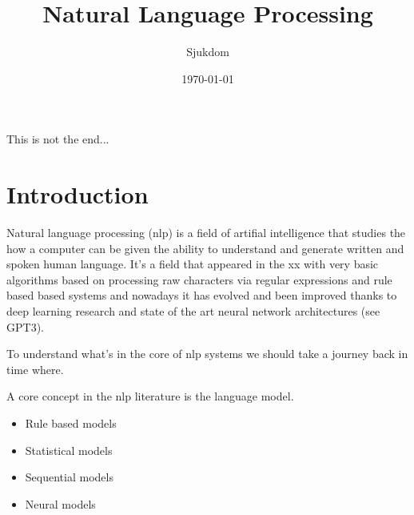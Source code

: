 \documentclass[a4paper, 12pt]{article}
\begin{document}
\title{Natural Language Processing}
\author{Sjukdom}
\date{\today}
\maketitle

\tableofcontents
\newpage
{}

	This is not the end...

\section{Introduction}

Natural language processing (nlp) is a field of artifial intelligence that studies the
how a computer can be given the ability to understand and generate written and spoken
human language. It's a field that appeared in the xx with very basic algorithms based
on processing raw characters via regular expressions and rule based based systems and 
nowadays it has evolved and been improved thanks to deep learning research and state
of the art neural network architectures (see GPT3). 

To understand what's in the core of nlp systems we should take a journey back in time
where.

A core concept in the nlp literature is the language model.

\begin{itemize}
	\item Rule based models
	\item Statistical models
	\item Sequential models
	\item Neural models
\end{itemize}
\end{document}
